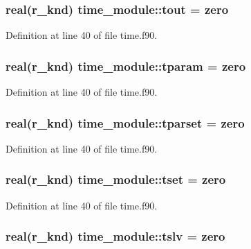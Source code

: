 \hypertarget{classtime__module_a67fe4201db76455b13a6140ddeb5c57d}{
\subsubsection[{tout}]{\setlength{\rightskip}{0pt plus 5cm}real(r\-\_\-knd) time\-\_\-module\-::tout = zero}}\label{classtime__module_a67fe4201db76455b13a6140ddeb5c57d}


Definition at line 40 of file time.\-f90.

\hypertarget{classtime__module_ab78f7d01ea1bde455310853bc2be1594}{
\subsubsection[{tparam}]{\setlength{\rightskip}{0pt plus 5cm}real(r\-\_\-knd) time\-\_\-module\-::tparam = zero}}\label{classtime__module_ab78f7d01ea1bde455310853bc2be1594}


Definition at line 40 of file time.\-f90.

\hypertarget{classtime__module_a5265ce5bfd23e9a9a77547577f88473d}{
\subsubsection[{tparset}]{\setlength{\rightskip}{0pt plus 5cm}real(r\-\_\-knd) time\-\_\-module\-::tparset = zero}}\label{classtime__module_a5265ce5bfd23e9a9a77547577f88473d}


Definition at line 40 of file time.\-f90.

\hypertarget{classtime__module_a81f8cc404349dd114670913d2d11f055}{
\subsubsection[{tset}]{\setlength{\rightskip}{0pt plus 5cm}real(r\-\_\-knd) time\-\_\-module\-::tset = zero}}\label{classtime__module_a81f8cc404349dd114670913d2d11f055}


Definition at line 40 of file time.\-f90.

\hypertarget{classtime__module_a1f3f475f37c8ce006cdd2de5693552d9}{
\subsubsection[{tslv}]{\setlength{\rightskip}{0pt plus 5cm}real(r\-\_\-knd) time\-\_\-module\-::tslv = zero}}\label{classtime__module_a1f3f475f37c8ce006cdd2de5693552d9}


